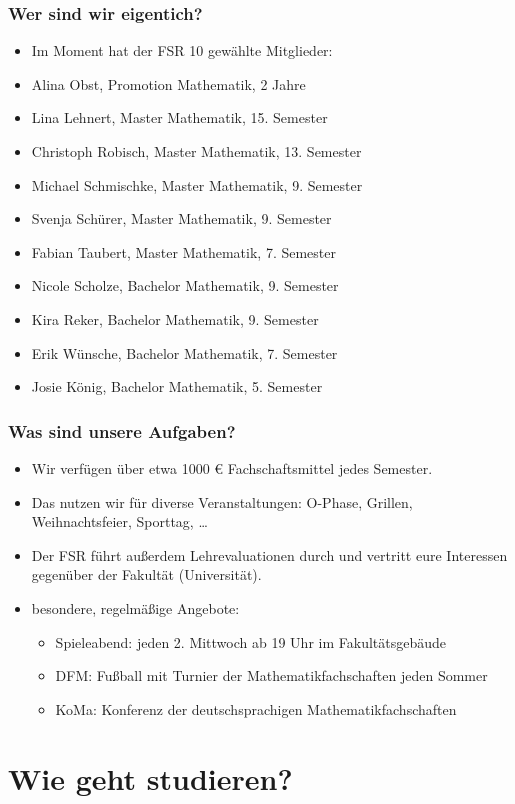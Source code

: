 \begin{frame}
\frametitle{Wer sind wir eigentich?}
\begin{itemize}
	\item Im Moment hat der FSR 10 gewählte Mitglieder:
	\item Alina Obst, Promotion Mathematik, 2 Jahre 
	\item Lina Lehnert, Master Mathematik, 15. Semester
	\item Christoph Robisch, Master Mathematik, 13. Semester
	\item Michael Schmischke, Master Mathematik, 9. Semester
	\item Svenja Schürer, Master Mathematik, 9. Semester
	\item Fabian Taubert, Master Mathematik, 7. Semester
	\item Nicole Scholze, Bachelor Mathematik, 9. Semester
	\item Kira Reker, Bachelor Mathematik, 9. Semester
	\item Erik Wünsche, Bachelor Mathematik, 7. Semester
	\item Josie König, Bachelor Mathematik, 5. Semester
\end{itemize}
\end{frame}

\begin{frame}
\frametitle{Was sind unsere Aufgaben?}
	\begin{itemize}
		\item Wir verfügen über etwa 1000 \euro{}  Fachschaftsmittel jedes Semester.
		\item Das nutzen wir für diverse Veranstaltungen: O-Phase, Grillen, Weihnachtsfeier, Sporttag, \dots
		\item Der FSR führt außerdem Lehrevaluationen durch und vertritt eure Interessen gegenüber der Fakultät (Universität).
		\item besondere, regelmäßige Angebote:
		\begin{itemize}
		\item Spieleabend: jeden 2. Mittwoch ab 19 Uhr im Fakultätsgebäude
		\item DFM: Fußball mit Turnier der Mathematikfachschaften jeden Sommer 
		\item KoMa: Konferenz der deutschsprachigen Mathematikfachschaften
		\end{itemize}
	\end{itemize}
\end{frame}

\section{Wie geht studieren?}
\frame{\tableofcontents[currentsection]}

